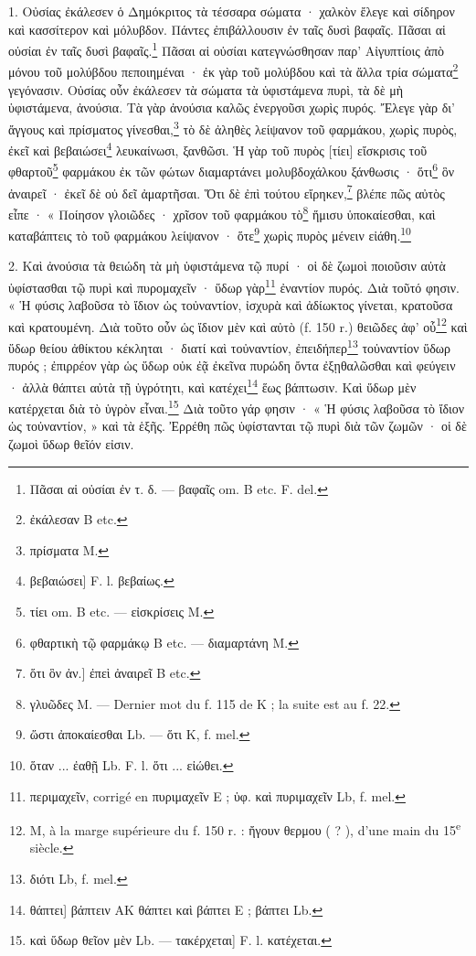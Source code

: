 \documentclass[landscape, a4paper, 11pt, oneside, polutonikogreek, french]{article}
\begin{document}
\bigskip

1. Οὐσίας ἐκάλεσεν ὁ Δημόκριτος τὰ τέσσαρα σώματα · χαλκὸν ἔλεγε καὶ σίδηρον καὶ κασσίτερον καὶ μόλυβδον. Πάντες ἐπιβάλλουσιν ἐν ταῖς δυσὶ βαφαῖς. Πᾶσαι αἱ οὐσίαι ἐν ταῖς δυσὶ βαφαῖς.\footnote{Πᾶσαι αἱ οὐσίαι ἐν τ. δ. --- βαφαῖς om. B etc. F. del.} Πᾶσαι αἱ οὐσίαι κατεγνώσθησαν παρ' Αἰγυπτίοις ἀπὸ μόνου τοῦ μολύβδου πεποιημέναι · ἐκ γὰρ τοῦ μολύβδου καὶ τὰ ἄλλα τρία σώματα\footnote{ἐκάλεσαν B etc.} γεγόνασιν. Οὐσίας οὖν ἐκάλεσεν τὰ σώματα τὰ ὑφιστάμενα πυρὶ, τὰ δὲ μὴ ὑφιστάμενα, ἀνούσια. Τὰ γὰρ ἀνούσια καλῶς ἐνεργοῦσι χωρὶς πυρός. Ἔλεγε γὰρ δι' ἄγγους καὶ πρίσματος γίνεσθαι,\footnote{πρίσματα M.} τὸ δὲ ἀληθὲς λείψανον τοῦ φαρμάκου, χωρὶς πυρὸς, ἐκεῖ καὶ βεβαιώσει\footnote{βεβαιώσει] F. l. βεβαίως.} λευκαίνωσι, ξανθῶσι. Ἡ γὰρ τοῦ πυρὸς [τίει] εἴσκρισις τοῦ φθαρτοῦ\footnote{τίει om. B etc. --- εἰσκρίσεις M.} φαρμάκου ἐκ τῶν φώτων διαμαρτάνει μολυβδοχάλκου ξάνθωσις · ὅτι\footnote{φθαρτικὴ τῷ φαρμάκῳ B etc. --- διαμαρτάνη M.} ὃν ἀναιρεῖ · ἐκεῖ δὲ οὐ δεῖ ἀμαρτῆσαι. Ὅτι δὲ ἐπὶ τούτου εἴρηκεν,\footnote{ὅτι ὃν ἀν.] ἐπεὶ ἀναιρεῖ B etc.} βλέπε πῶς αὐτὸς εἶπε · « Ποίησον γλοιῶδες · χρῖσον τοῦ φαρμάκου τὸ\footnote{γλυῶδες M. --- Dernier mot du f. 115 de K ; la suite est au f. 22.} ἥμισυ ὑποκαίεσθαι, καὶ καταβάπτεις τὸ τοῦ φαρμάκου λείψανον · ὅτε\footnote{ὥστι ἀποκαίεσθαι Lb. --- ὅτι K, f. mel.} χωρὶς πυρὸς μένειν εἰάθη.\footnote{ὅταν ... ἐαθῇ Lb. F. l. ὅτι ... εἰώθει.}

2. Καὶ ἀνούσια τὰ θειώδη τὰ μὴ ὑφιστάμενα τῷ πυρί · οἱ δὲ ζωμοὶ ποιοῦσιν αὐτὰ ὑφίστασθαι τῷ πυρὶ καὶ πυρομαχεῖν · ὕδωρ γὰρ\footnote{περιμαχεῖν, corrigé en πυριμαχεῖν E ; ὑφ. καὶ πυριμαχεῖν Lb, f. mel.} ἐναντίον πυρός. Διὰ τοῦτό φησιν. « Ἡ φύσις λαβοῦσα τὸ ἴδιον ὡς τοὐναντίον, ἰσχυρὰ καὶ ἀδίωκτος γίνεται, κρατοῦσα καὶ κρατουμένη. Διὰ τοῦτο οὖν ὡς ἴδιον μὲν καὶ αὐτὸ (f. 150 r.) θειῶδες ἀφ' οὗ\footnote{M, à la marge supérieure du f. 150 r. : ἤγουν θερμου ( ? ), d'une main du 15\textsuperscript{e} siècle.} καὶ ὕδωρ θείου ἀθίκτου κέκληται · διατί καὶ τοὐναντίον, ἐπειδήπερ\footnote{διότι Lb, f. mel.} τοὐναντίον ὕδωρ πυρός ; ἐπιρρέον γὰρ ὡς ὕδωρ οὐκ ἐᾷ ἐκεῖνα πυρώδη ὄντα ἐξῃθαλῶσθαι καὶ φεύγειν · ἀλλὰ θάπτει αὐτὰ τῇ ὑγρότητι, καὶ κατέχει\footnote{θάπτει] βάπτειν AK θάπτει καὶ βάπτει E ; βάπτει Lb.} ἕως βάπτωσιν. Καὶ ὕδωρ μὲν κατέρχεται διὰ τὸ ὑγρὸν εἶναι.\footnote{καὶ ὕδωρ θεῖον μὲν Lb. --- τακέρχεται] F. l. κατέχεται.} Διὰ τοῦτο γάρ φησιν · « Ἡ φύσις λαβοῦσα τὸ ἴδιον ὡς τοὐναντίον, » καὶ τὰ ἑξῆς. Ἐρρέθη πῶς ὑφίστανται τῷ πυρὶ διὰ τῶν ζωμῶν · οἱ δὲ ζωμοὶ ὕδωρ θεῖόν εἰσιν.

\bigskip
\centerline{\EightStarTaper}
\centerline{\EightStarTaper\EightStarTaper}
\bigskip
\end{document}
